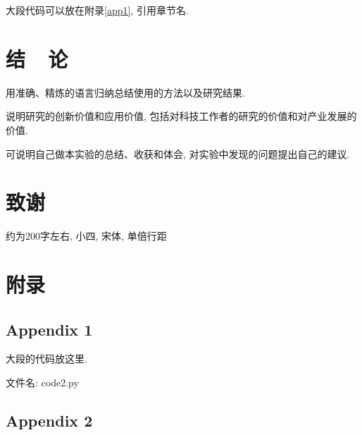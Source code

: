 \documentclass{urtemp}
\begin{document}
大段代码可以放在附录\ref{app1}, 引用章节名.

\section{结~~论}
用准确、精炼的语言归纳总结使用的方法以及研究结果. 

说明研究的创新价值和应用价值, 包括对科技工作者的研究的价值和对产业发展的价值. 

可说明自己做本实验的总结、收获和体会, 对实验中发现的问题提出自己的建议. 



{\centering\section*{致谢}}
约为200字左右, 小四, 宋体, 单倍行距


\renewcommand\refname{\heiti\xiaosihao\centerline{参考文献}\global\def\refname{参考文献}}
\vskip 12pt

\let\OLDthebibliography\thebibliography
\renewcommand\thebibliography[1]{
    \OLDthebibliography{#1}
    \setlength{\parskip}{0pt}
    \setlength{\itemsep}{0pt plus 0.3ex}
}

{
\renewcommand{\baselinestretch}{0.9}


}

\setcounter{equation}{0}
\renewcommand{\theequation}{A.\arabic{equation}}

\section*{附录}

\subsection*{Appendix 1}\label{app1}

大段的代码放这里.

文件名: code2.py


\subsection*{Appendix 2}
\end{document}
